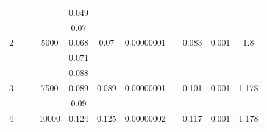 \documentclass[a4paper,12pt]{article}
\begin{document}
\begin{justify}
\begin{table}[!h]
\begin{adjustwidth}{-1.25cm}{}
\begin{tabular}{|c|c|c|c|c|c|c|c|c|c|c|}
                   &                        &                                                          &                        & 0.049  &                        &                             &                                 &                        &                        &                        \\ \cline{1-1} \cline{4-7} \cline{9-11} 
\multirow{3}{*}{2} &                        &                                                          & \multirow{3}{*}{5000}  & 0.07   & \multirow{3}{*}{0.07}  & \multirow{3}{*}{0.00000001} &                                 & \multirow{3}{*}{0.083} & \multirow{3}{*}{0.001} & \multirow{3}{*}{1.8}   \\ \cline{5-5}
                   &                        &                                                          &                        & 0.068  &                        &                             &                                 &                        &                        &                        \\ \cline{5-5}
                   &                        &                                                          &                        & 0.071  &                        &                             &                                 &                        &                        &                        \\ \cline{1-1} \cline{4-7} \cline{9-11} 
\multirow{3}{*}{3} &                        &                                                          & \multirow{3}{*}{7500}  & 0.088  & \multirow{3}{*}{0.089} & \multirow{3}{*}{0.00000001} &                                 & \multirow{3}{*}{0.101} & \multirow{3}{*}{0.001} & \multirow{3}{*}{1.178} \\ \cline{5-5}
                   &                        &                                                          &                        & 0.089  &                        &                             &                                 &                        &                        &                        \\ \cline{5-5}
                   &                        &                                                          &                        & 0.09   &                        &                             &                                 &                        &                        &                        \\ \cline{1-1} \cline{4-7} \cline{9-11} 
\multirow{3}{*}{4} &                        &                                                          & \multirow{3}{*}{10000} & 0.124  & \multirow{3}{*}{0.125} & \multirow{3}{*}{0.00000002} &                                 & \multirow{3}{*}{0.117} & \multirow{3}{*}{0.001} & \multirow{3}{*}{1.178} \\ \cline{5-5}

\end{tabular}
\end{adjustwidth}
\end{table}
\end{justify}
\end{document}
